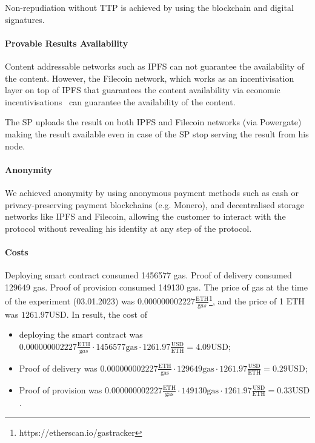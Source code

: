 \documentclass{ieeeaccess}
\begin{document}
Non-repudiation without TTP is achieved by using the blockchain and digital signatures. 

\paragraph{Provable Results Availability}
Content addressable networks such as IPFS can not guarantee the availability of the content. However, the Filecoin network, which works as an incentivisation layer on top of IPFS that guarantees the content availability via economic incentivisations~\cite{protocollabsFilecoinDecentralizedStorage2017} can guarantee the availability of the content.

The SP uploads the result on both IPFS and Filecoin networks (via Powergate) making the result available even in case of the SP stop serving the result from his node.

\paragraph{Anonymity}
We achieved anonymity by using anonymous payment methods such as cash or privacy-preserving payment blockchains (e.g. Monero), and decentralised storage networks like IPFS and Filecoin, allowing the customer to interact with the protocol without revealing his identity at any step of the protocol.

\paragraph{Costs}
Deploying smart contract consumed 1456577 gas.
Proof of delivery consumed 129649 gas.
Proof of provision consumed 149130 gas.
The price of gas at the time of the experiment (03.01.2023) was $0.000000002227 \frac{\mathrm{ETH}}{\mathrm gas}$\footnote{https://etherscan.io/gastracker}, and the price of 1 $\mathrm{ETH}$ was $1261.97 \mathrm{USD}$.
In result, the cost of 
\begin{itemize}
  \item deploying the smart contract was $0.000000002227 \frac{\mathrm{ETH}}{\mathrm gas} \cdot 1456577 \mathrm{gas} \cdot 1261.97 \frac{\mathrm{USD}}{\mathrm{ETH}} = 4.09 \mathrm{USD}$; 
  \item Proof of delivery was $0.000000002227 \mathrm{\frac{ETH}{gas}} \cdot 129649 \mathrm{gas} \cdot 1261.97 \frac{\mathrm{USD}}{\mathrm{ETH}} = 0.29 \mathrm{USD}$; 
  \item Proof of provision was $0.000000002227 \mathrm{\frac{ETH}{gas}} \cdot 149130 \mathrm{gas} \cdot 1261.97 \frac{\mathrm{USD}}{\mathrm{ETH}} = 0.33 \mathrm{USD}$.
\end{itemize}
\end{document}
